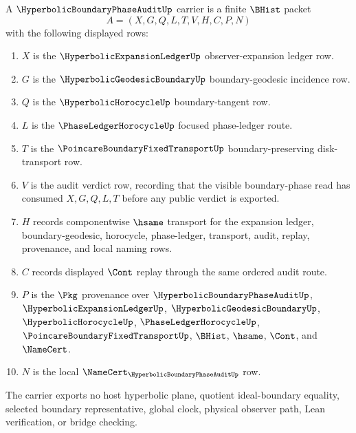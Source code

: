 \begin{definition}
\label{def:hyperbolic-boundary-phase-audit-carrier}
A $\HyperbolicBoundaryPhaseAuditUp$ carrier is a finite $\BHist$ packet
$$
A=(X,G,Q,L,T,V,H,C,P,N)
$$
with the following displayed rows:
\begin{enumerate}
\item $X$ is the $\HyperbolicExpansionLedgerUp$ observer-expansion ledger row.
\item $G$ is the $\HyperbolicGeodesicBoundaryUp$ boundary-geodesic incidence row.
\item $Q$ is the $\HyperbolicHorocycleUp$ boundary-tangent row.
\item $L$ is the $\PhaseLedgerHorocycleUp$ focused phase-ledger route.
\item $T$ is the $\PoincareBoundaryFixedTransportUp$ boundary-preserving disk-transport row.
\item $V$ is the audit verdict row, recording that the visible boundary-phase read has consumed $X,G,Q,L,T$ before any public verdict is exported.
\item $H$ records componentwise $\hsame$ transport for the expansion ledger, boundary-geodesic, horocycle, phase-ledger, transport, audit, replay, provenance, and local naming rows.
\item $C$ records displayed $\Cont$ replay through the same ordered audit route.
\item $P$ is the $\Pkg$ provenance over $\HyperbolicBoundaryPhaseAuditUp$, $\HyperbolicExpansionLedgerUp$, $\HyperbolicGeodesicBoundaryUp$, $\HyperbolicHorocycleUp$, $\PhaseLedgerHorocycleUp$, $\PoincareBoundaryFixedTransportUp$, $\BHist$, $\hsame$, $\Cont$, and $\NameCert$.
\item $N$ is the local $\NameCert_{\HyperbolicBoundaryPhaseAuditUp}$ row.
\end{enumerate}
The carrier exports no host hyperbolic plane, quotient ideal-boundary equality, selected boundary representative, global clock, physical observer path, Lean verification, or bridge checking.
\end{definition}

